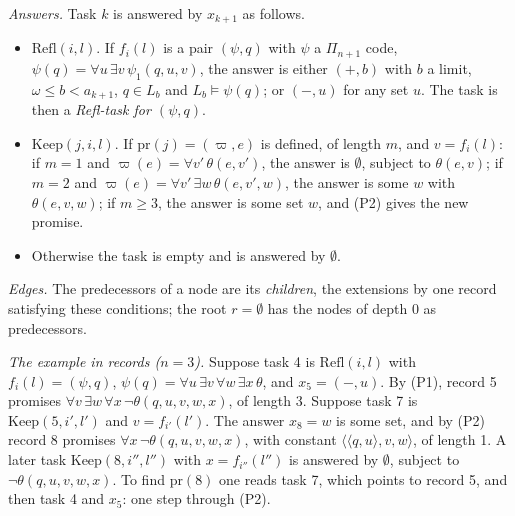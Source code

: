 \documentclass[11pt]{article}
\begin{document}
\begin{statement}
\emph{Answers.} Task $k$ is answered by $x_{k+1}$ as follows.
\begin{itemize}
\item $\mathrm{Refl}(i,l)$. If $f_i(l)$ is a pair $(\psi, q)$ with $\psi$ a $\Pi_{n+1}$ code, $\psi(q) = \forall u\,
  \exists v\, \psi_1(q,u,v)$, the answer is either $(+, b)$ with $b$ a limit, $\omega \le b < a_{k+1}$, $q \in L_b$ and
  $L_b \models \psi(q)$; or $(-, u)$ for any set $u$. The task is then a \emph{Refl-task for $(\psi,q)$}.
\item $\mathrm{Keep}(j,i,l)$. If $\mathrm{pr}(j) = (\varpi, e)$ is defined, of length $m$, and $v = f_i(l)$: if $m = 1$
  and $\varpi(e) = \forall v'\, \theta(e,v')$, the answer is $\emptyset$, subject to $\theta(e,v)$; if $m = 2$ and $\varpi(e) =
  \forall v'\, \exists w\, \theta(e,v',w)$, the answer is some $w$ with $\theta(e,v,w)$; if $m \ge 3$, the answer is
  some set $w$, and (P2) gives the new promise.
\item Otherwise the task is empty and is answered by $\emptyset$.
\end{itemize}

\emph{Edges.} The predecessors of a node are its \emph{children}, the extensions by one record satisfying these
conditions; the root $r = \emptyset$ has the nodes of depth 0 as predecessors.
\end{statement}

\emph{The example in records ($n = 3$).} Suppose task 4 is $\mathrm{Refl}(i,l)$ with $f_i(l) = (\psi, q)$, $\psi(q) = \forall u\,
\exists v\, \forall w\, \exists x\, \theta$, and $x_5 = (-, u)$. By (P1), record 5 promises $\forall v\, \exists w\,
\forall x\, \neg\theta(q,u,v,w,x)$, of length 3. Suppose task 7 is $\mathrm{Keep}(5, i', l')$ and $v = f_{i'}(l')$. The
answer $x_8 = w$ is some set, and by (P2) record 8 promises $\forall x\, \neg\theta(q,u,v,w,x)$, with constant
$\langle\langle q,u\rangle, v, w\rangle$, of length 1. A later task $\mathrm{Keep}(8, i'', l'')$ with $x = f_{i''}(l'')$
is answered by $\emptyset$, subject to $\neg\theta(q,u,v,w,x)$. To find $\mathrm{pr}(8)$ one reads task 7, which points
to record 5, and then task 4 and $x_5$: one step through (P2).
\end{document}
